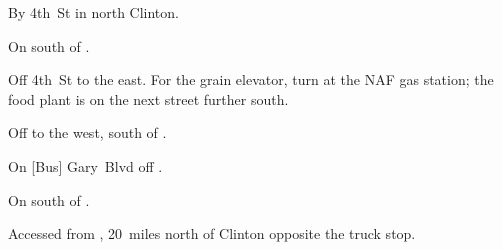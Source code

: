 
\begin{LocationList}

By  4th~St in north Clinton.

On  south of .

Off  4th~St to the east.
For the grain elevator, turn at the NAF gas station; the food plant is on the next street further south.

Off  to the west, south of .

On [Bus] Gary~Blvd off  .

\Location{\TruckStop \Gas \Rest \Service}
On  south of .

Accessed from , 20~miles north of Clinton opposite the  truck stop.

\end{LocationList}
